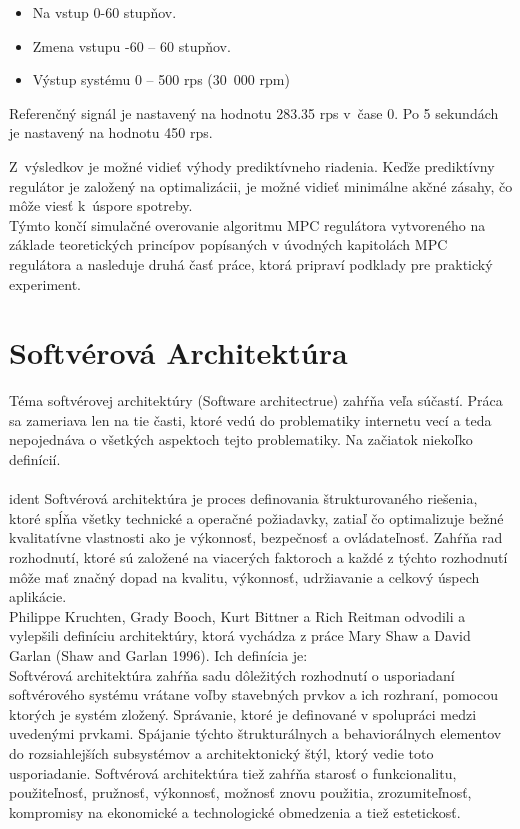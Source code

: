\begin{itemize}
\item
  Na vstup 0-60 stupňov.
\item
  Zmena vstupu -60 -- 60 stupňov.
\item
  Výstup systému 0 -- 500 rps (30~000 rpm)
\end{itemize}

Referenčný signál je nastavený na hodnotu 283.35 rps v~čase 0. Po 5
sekundách je nastavený na hodnotu 450 rps.

Z~výsledkov je možné vidieť výhody prediktívneho riadenia. Keďže
prediktívny regulátor je založený na optimalizácii, je možné vidieť
minimálne akčné zásahy, čo môže viesť k~úspore spotreby.\cite{MPC08}\\
Týmto končí simulačné overovanie algoritmu MPC regulátora vytvoreného na základe teoretických princípov popísaných v úvodných kapitolách MPC regulátora a nasleduje druhá časť práce, ktorá pripraví podklady pre praktický experiment.

\section{Softvérová Architektúra}
Téma softvérovej architektúry (Software architectrue) zahŕňa veľa súčastí. Práca sa zameriava len na tie časti, ktoré vedú do problematiky internetu vecí a teda nepojednáva o všetkých aspektoch tejto problematiky. Na začiatok niekoľko definícií.\\
\\ident 
Softvérová architektúra je proces definovania štrukturovaného riešenia, ktoré spĺňa všetky technické a operačné požiadavky, zatiaľ čo optimalizuje bežné kvalitatívne vlastnosti ako je výkonnosť, bezpečnosť a ovládateľnosť. Zahŕňa rad rozhodnutí, ktoré sú založené na viacerých faktoroch a každé z týchto rozhodnutí môže mať značný dopad na kvalitu, výkonnosť, udržiavanie a celkový úspech aplikácie.\\
\indent Philippe Kruchten, Grady Booch, Kurt Bittner a Rich Reitman odvodili a vylepšili definíciu architektúry, ktorá vychádza z práce Mary Shaw a David Garlan (Shaw and Garlan 1996). Ich definícia je:\\
\indent Softvérová architektúra zahŕňa sadu dôležitých rozhodnutí o usporiadaní softvérového systému vrátane voľby stavebných prvkov a ich rozhraní, pomocou ktorých je systém zložený. Správanie, ktoré je definované v spolupráci medzi uvedenými prvkami. Spájanie týchto štrukturálnych a behaviorálnych elementov do rozsiahlejších subsystémov a architektonický štýl, ktorý vedie toto usporiadanie. Softvérová architektúra tiež zahŕňa starosť o funkcionalitu, použiteľnosť, pružnosť, výkonnosť, možnosť znovu použitia, zrozumiteľnosť, kompromisy na ekonomické a technologické obmedzenia a tiež estetickosť. \cite{IOT02}

